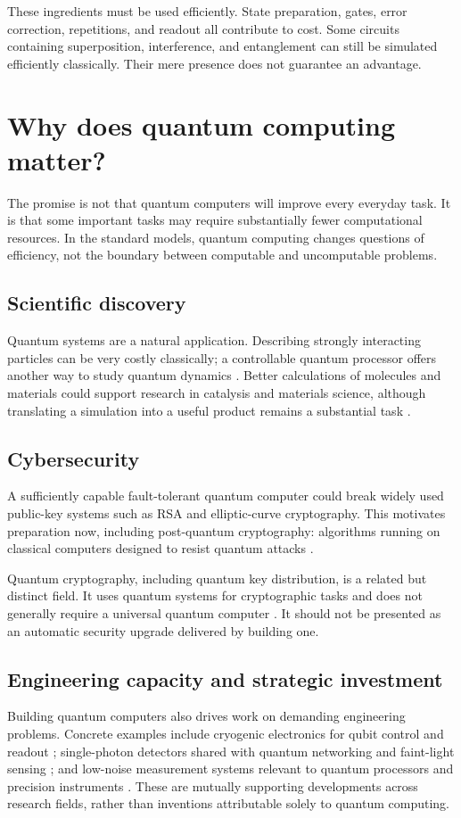 \documentclass[11pt,a4paper]{article}
\begin{document}
These ingredients must be used efficiently. State preparation, gates, error correction, repetitions, and readout all contribute to cost. Some circuits containing superposition, interference, and entanglement can still be simulated efficiently classically. Their mere presence does not guarantee an advantage.

\section{Why does quantum computing matter?}
The promise is not that quantum computers will improve every everyday task. It is that some important tasks may require substantially fewer computational resources. In the standard models, quantum computing changes questions of efficiency, not the boundary between computable and uncomputable problems.

\subsection{Scientific discovery}
Quantum systems are a natural application. Describing strongly interacting particles can be very costly classically; a controllable quantum processor offers another way to study quantum dynamics \cite{preskill}. Better calculations of molecules and materials could support research in catalysis and materials science, although translating a simulation into a useful product remains a substantial task \cite{doe}.

\subsection{Cybersecurity}
A sufficiently capable fault-tolerant quantum computer could break widely used public-key systems such as RSA and elliptic-curve cryptography. This motivates preparation now, including post-quantum cryptography: algorithms running on classical computers designed to resist quantum attacks \cite{pqc}.

Quantum cryptography, including quantum key distribution, is a related but distinct field. It uses quantum systems for cryptographic tasks and does not generally require a universal quantum computer \cite{qcrypto}. It should not be presented as an automatic security upgrade delivered by building one.

\newpage
\subsection{Engineering capacity and strategic investment}
Building quantum computers also drives work on demanding engineering problems. Concrete examples include cryogenic electronics for qubit control and readout \cite{cryo}; single-photon detectors shared with quantum networking and faint-light sensing \cite{detectors}; and low-noise measurement systems relevant to quantum processors and precision instruments \cite{readout}. These are mutually supporting developments across research fields, rather than inventions attributable solely to quantum computing.
\end{document}
